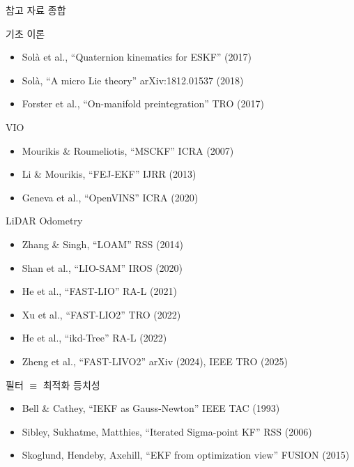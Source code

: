 \begin{frame}[shrink=30]{참고 자료 종합}
  \begin{block}{기초 이론}
    \begin{itemize}
      \item Sol\`{a} et al., ``Quaternion kinematics for ESKF'' (2017)
      \item Sol\`{a}, ``A micro Lie theory'' arXiv:1812.01537 (2018)
      \item Forster et al., ``On-manifold preintegration'' TRO (2017)
    \end{itemize}
  \end{block}
  \pause
  \begin{block}{VIO}
    \begin{itemize}
      \item Mourikis \& Roumeliotis, ``MSCKF'' ICRA (2007)
      \item Li \& Mourikis, ``FEJ-EKF'' IJRR (2013)
      \item Geneva et al., ``OpenVINS'' ICRA (2020)
    \end{itemize}
  \end{block}
  \pause
  \begin{block}{LiDAR Odometry}
    \begin{itemize}
      \item Zhang \& Singh, ``LOAM'' RSS (2014)
      \item Shan et al., ``LIO-SAM'' IROS (2020)
      \item He et al., ``FAST-LIO'' RA-L (2021)
      \item Xu et al., ``FAST-LIO2'' TRO (2022)
      \item He et al., ``ikd-Tree'' RA-L (2022)
      \item Zheng et al., ``FAST-LIVO2'' arXiv (2024), IEEE TRO (2025)
    \end{itemize}
  \end{block}
  \pause
  \begin{block}{필터 $\equiv$ 최적화 등치성}
    \begin{itemize}
      \item Bell \& Cathey, ``IEKF as Gauss-Newton'' IEEE TAC (1993)
      \item Sibley, Sukhatme, Matthies, ``Iterated Sigma-point KF'' RSS (2006)
      \item Skoglund, Hendeby, Axehill, ``EKF from optimization view'' FUSION (2015)
    \end{itemize}
  \end{block}
\end{frame}

